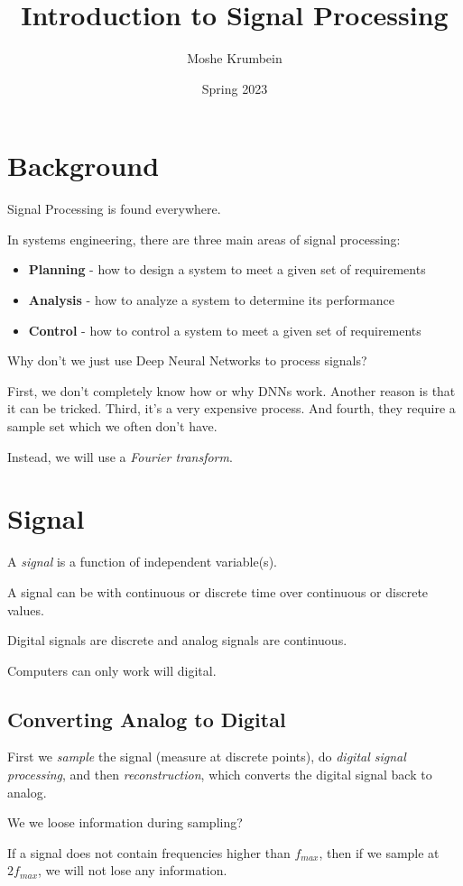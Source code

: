 \documentclass[00_complete]{subfiles}
\title{Introduction to Signal Processing}
\author{Moshe Krumbein}
\date{Spring 2023}
\begin{document}
\section{Background}
Signal Processing is found everywhere.

In systems engineering, there are three main areas of signal processing:
\begin{itemize}
    \item \textbf{Planning} - how to design a system to meet a given set of requirements 
    \item \textbf{Analysis} - how to analyze a system to determine its performance
    \item \textbf{Control} - how to control a system to meet a given set of requirements
\end{itemize}
Why don't we just use Deep Neural Networks to process signals?

First, we don't completely know how or why DNNs work. Another reason is that it
can be tricked. Third, it's a very expensive process. And fourth, they require a
sample set which we often don't have. 

Instead, we will use a \textit{Fourier transform}.
\section{Signal}
A \textit{signal} is a function of independent variable(s).

A signal can be with continuous or discrete time over continuous or discrete
values.

Digital signals are discrete and analog signals are continuous.

Computers can only work will digital.

\subsection{Converting Analog to Digital}

First we \textit{sample} the signal (measure at discrete points), do
\textit{digital signal processing}, and then \textit{reconstruction}, which
converts the digital signal back to analog.

We we loose information during sampling?

\begin{definition}
    If a signal does not contain frequencies higher than $f_{max}$, then if we
    sample at $2f_{max}$, we will not lose any information.
\end{definition}
\end{document}
